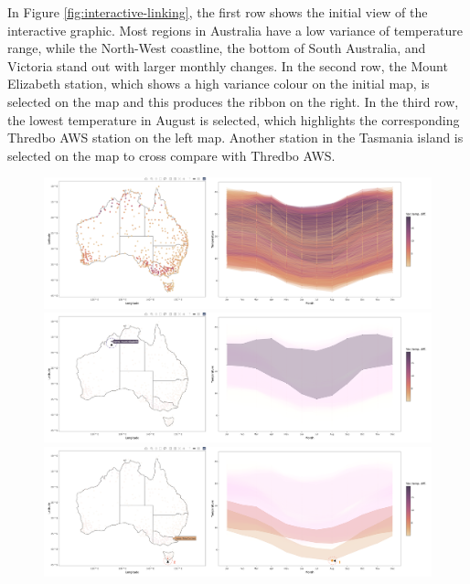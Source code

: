 \documentclass[
]{jss}
\begin{document}
In Figure \ref{fig:interactive-linking}, the first row shows the initial view of the interactive graphic. Most regions in Australia have a low variance of temperature range, while the North-West coastline, the bottom of South Australia, and Victoria stand out with larger monthly changes. In the second row, the Mount Elizabeth station, which shows a high variance colour on the initial map, is selected on the map and this produces the ribbon on the right. In the third row, the lowest temperature in August is selected, which highlights the corresponding Thredbo AWS station on the left map. Another station in the Tasmania island is selected on the map to cross compare with Thredbo AWS.

\begin{CodeChunk}
\begin{figure}

{\centering \includegraphics[width=1\linewidth,height=0.23\textheight]{../figures/linking} \includegraphics[width=1\linewidth,height=0.23\textheight]{../figures/linking-north} \includegraphics[width=1\linewidth,height=0.23\textheight]{../figures/linking-lower} 

}


\end{figure}
\end{CodeChunk}
\end{document}
